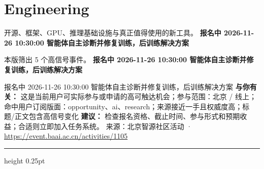 \documentclass[10.5pt]{ctexart}
\begin{document}
\section*{Engineering}
{\color{ormuted} 开源、框架、GPU、推理基础设施与真正值得使用的新工具。}
\vspace{2mm}
{\LARGE\bfseries 报名中 2026-11-26 10:30:00 智能体自主诊断并修复训练，后训练解决方案}\par
\vspace{1mm}
{\color{ormuted} 本版筛出 5 个高信号事件。}
\vspace{3mm}
{\Large\bfseries 报名中 2026-11-26 10:30:00 智能体自主诊断并修复训练，后训练解决方案}\par
报名中 2026-11-26 10:30:00 智能体自主诊断并修复训练，后训练解决方案
\textbf{与你有关：} 这是当前用户可实际参与或申请的高可触达机会；参与范围：北京 / 线上；命中用户订阅版面：opportunity、ai、research；来源接近一手且权威度高；标题/正文包含高信号变化
\textbf{建议：} 检查报名资格、截止时间、参与形式和预期收益；合适则立即加入任务系统。
{\footnotesize\color{ormuted} 来源：北京智源社区活动 · \url{https://event.baai.ac.cn/activities/1105}}
\vspace{4mm}
\hrule height 0.25pt
\vspace{3mm}
\end{document}
